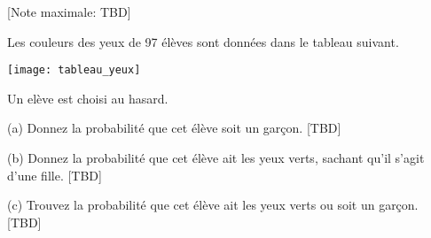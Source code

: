\begin{question}
  \hspace*{\fill} [Note maximale: TBD]\par
  \medskip
  \noindent Les couleurs des yeux de 97 élèves sont données dans le tableau suivant.\par
  \medskip  
  \texttt{[image: tableau\_yeux]}\par  
  \medskip
  \noindent Un elève est choisi au hasard.\par
  (a) Donnez la probabilité que cet élève soit un garçon.\hspace*{\fill} [TBD]\par

  (b) Donnez la probabilité que cet élève ait les yeux verts, sachant qu’il s’agit d’une fille.\hspace*{\fill} [TBD]\par

  (c) Trouvez la probabilité que cet élève ait les yeux verts ou soit un garçon.\hspace*{\fill} [TBD]\par
  

\end{question}

